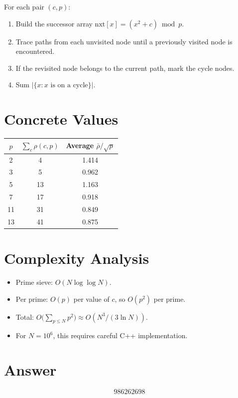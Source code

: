 \documentclass[11pt]{article}
\begin{document}
For each pair $(c, p)$:
\begin{enumerate}
\item Build the successor array $\mathrm{nxt}[x] = (x^2 + c) \bmod p$.
\item Trace paths from each unvisited node until a previously visited node is encountered.
\item If the revisited node belongs to the current path, mark the cycle nodes.
\item Sum $|\{x : x \text{ is on a cycle}\}|$.
\end{enumerate}

\section{Concrete Values}

\begin{center}
\begin{tabular}{ccc}
\toprule
$p$ & $\sum_c \rho(c,p)$ & Average $\bar{\rho}/\sqrt{p}$ \\
\midrule
2 & 4 & 1.414 \\
3 & 5 & 0.962 \\
5 & 13 & 1.163 \\
7 & 17 & 0.918 \\
11 & 31 & 0.849 \\
13 & 41 & 0.875 \\
\bottomrule
\end{tabular}
\end{center}

\section{Complexity Analysis}

\begin{itemize}
\item Prime sieve: $O(N \log\log N)$.
\item Per prime: $O(p)$ per value of $c$, so $O(p^2)$ per prime.
\item Total: $O\!\bigl(\sum_{p \le N} p^2\bigr) \approx O(N^3/(3\ln N))$.
\item For $N = 10^6$, this requires careful C++ implementation.
\end{itemize}

\section{Answer}

\[
\boxed{986262698}
\]
\end{document}
